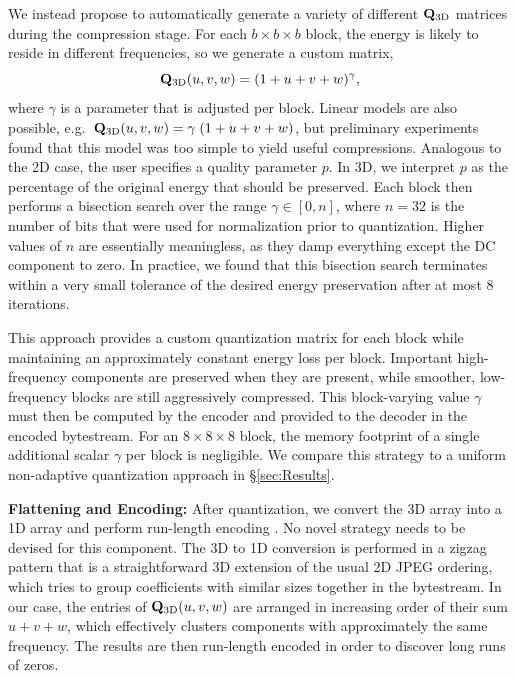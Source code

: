 We instead propose to automatically generate a variety of different $\mathbf{Q}_{\textrm{3D}}$ matrices during the compression stage. For each $b \times b \times b$ block, the energy is likely to reside in different frequencies, so we generate a custom matrix,
\begin{equation}
\mathbf{Q}_{\textrm{3D}}(u,v,w) = (1 + u + v + w)^\gamma,
\end{equation}
where $\gamma$ is a parameter that is adjusted per block. Linear models are also possible, e.g.~$\mathbf{Q}_{\textrm{3D}}(u,v,w) = \gamma\;(1 + u + v + w)$, but preliminary experiments found that this model was too simple to yield useful compressions. Analogous to the 2D case, the user specifies a quality parameter $p$. In 3D, we interpret $p$ as the percentage of the original energy that should be preserved. Each block then performs a bisection search over the range $\gamma \in [0, n]$, where $n = 32$ is the number of bits that were used for normalization prior to quantization. Higher values of $n$ are essentially meaningless, as they damp everything except the DC component to zero. In practice, we found that this bisection search terminates within a very small tolerance of the desired energy preservation after at most 8 iterations.

This approach provides a custom quantization matrix for each block while maintaining an approximately constant energy loss per block. Important high-frequency components are preserved when they are present, while smoother, low-frequency blocks are still aggressively compressed. This block-varying value $\gamma$ must then be computed by the encoder and provided to the decoder in the encoded bytestream. For an $8 \times 8 \times 8$ block, the memory footprint of a single additional scalar $\gamma$ per block is negligible. We compare this strategy to a uniform non-adaptive quantization approach in \S\ref{sec:Results}.

\noindent \textbf{Flattening and Encoding:} After quantization, we convert the 3D array into a 1D array and perform run-length encoding \cite{Yeo:1995:VRD,Sayood:2012:JPEG}. No novel strategy needs to be devised for this component. The 3D to 1D conversion is performed in a zigzag pattern that is a straightforward 3D extension of the usual 2D JPEG ordering, which tries to group coefficients with similar sizes together in the bytestream.  In our case, the entries of $\mathbf{Q}_{\textrm{3D}}(u,v,w)$ are arranged in increasing order of their sum $u + v + w$, which effectively clusters components with approximately the same frequency. The results are then run-length encoded in order to discover long runs of zeros.

